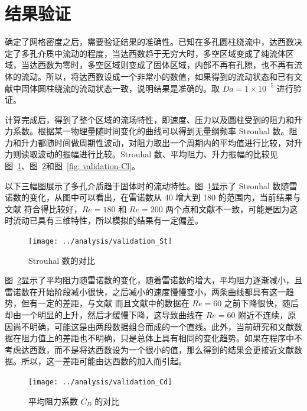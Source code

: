 \section{结果验证}\label{sec: result validation}

确定了网格密度之后，需要验证结果的准确性。已知在多孔圆柱绕流中，达西数决定了多孔介质中流动的程度，当达西数趋于无穷大时，多空区域变成了纯流体区域，当达西数为零时，多空区域则变成了固体区域，内部不再有孔隙，也不再有流体的流动。所以，将达西数设成一个非常小的数值，如果得到的流动状态和已有文献中固体圆柱绕流的流动状态一致，说明结果是准确的。取 $Da=1\times 10^{-5}$ 进行验证。

计算完成后，得到了整个区域的流场特性，即速度、压力以及圆柱受到的阻力和升力系数。根据某一物理量随时间变化的曲线可以得到无量纲频率 Strouhal 数。阻力和升力都随时间做周期性波动，对阻力取出一个周期内的平均值进行比较，对升力则读取波动的振幅进行比较。Strouhal 数、平均阻力、升力振幅的比较见图~\ref{fig: validation-St}、图~\ref{fig: validation-Cd}和图~\ref{fig: validation-Cl}。

以下三幅图展示了多孔介质趋于固体时的流动特性。图~\ref{fig: validation-St}显示了 Strouhal 数随雷诺数的变化，从图中可以看出，在雷诺数从 40 增大到 180 的范围内，当前结果与文献  符合得比较好，$Re=180$ 和 $Re=200$ 两个点和文献不一致，可能是因为这时流动已具有三维特性，所以模拟的结果有一定偏差。

\begin{figure}
	\centering
	\texttt{[image: ../analysis/validation\_St]}
	\caption{Strouhal 数的对比}
	\label{fig: validation-St}
\end{figure}

图~\ref{fig: validation-Cd}显示了平均阻力随雷诺数的变化，随着雷诺数的增大，平均阻力逐渐减小，且雷诺数在开始阶段减小很快，之后减小的速度慢慢变小，两条曲线都具有这一趋势，但有一定的差距，与文献  而且文献中的数据在 $Re=60$ 之前下降很快，随后却由一个明显的上升，然后才缓慢下降，这导致曲线在 $Re=60$ 附近不连续，原因尚不明确，可能这是由两段数据组合而成的一个直线。此外，当前研究和文献数据在阻力值上的差距也不明确，只是总体上具有相同的变化趋势。如果在程序中不考虑达西数，而不是将达西数设为一个很小的值，那么得到的结果会更接近文献数据。所以，这一差距可能由达西数的加入而引起。

\begin{figure}[ht]
	\centering
	\texttt{[image: ../analysis/validation\_Cd]}
	\caption{平均阻力系数 $C_D$ 的对比}
	\label{fig: validation-Cd}
\end{figure}

